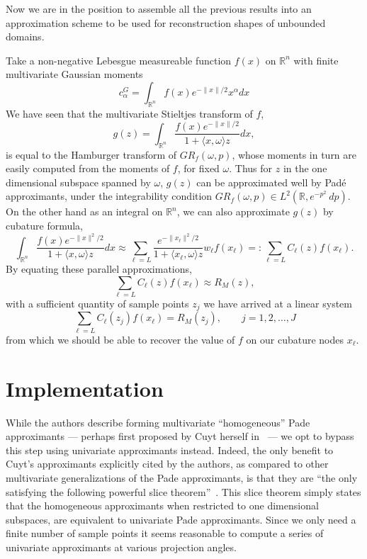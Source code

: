 \documentclass{amsart}
\theoremstyle{remark}
\numberwithin{equation}{section}
\newcommand{\RR}{\mathbb{R}}
\begin{document}



Now we are in the position to assemble all the previous results into an approximation scheme to be used for reconstruction shapes of unbounded domains.

Take a non-negative Lebesgue measureable function $f(x)$ on $\RR^n$ with finite multivariate Gaussian moments
\[
    c^G_\alpha = \int_{\RR^n} f(x)e^{-\|x\|/2} x^\alpha dx
\]
We have seen that the multivariate Stieltjes transform of $f$, 
\[
    g(z) = \int_{\RR^n} \frac{f(x)e^{-\|x\|/2}}{1 + \langle x, \omega \rangle z} dx,
\]
is equal to the Hamburger transform of $GR_f(\omega, p)$, whose moments in turn are easily computed from the moments of $f$, for fixed $\omega$. Thus for $z$ in the one dimensional subspace spanned by $\omega$, $g(z)$ can be approximated well by Pad\'e approximants, under the integrability condition $GR_f(\omega, p) \in L^2(\RR, e^{-p^2}~dp)$. On the other hand as an integral on $\RR^n$, we can also approximate $g(z)$ by cubature formula,
\[
    \int_{\RR^n} \frac{f(x)e^{-\|x\|^2/2}}{1 + \langle x, \omega \rangle z} dx 
    \approx \sum_{\ell = L} \frac{e^{-\|x_\ell\|^2/2}}{1 + \langle x_\ell, \omega \rangle z} w_\ell f(x_\ell)
    =: \sum_{\ell = L} C_\ell(z) f(x_\ell).
\]
By equating these parallel approximations, 
\[
    \sum_{\ell = L} C_\ell(z) f(x_\ell) \approx R_M(z),
\]
with a sufficient quantity of sample points $z_j$ we have arrived at a linear system
\[
    \sum_{\ell = L} C_\ell(z_j) f(x_\ell) = R_M(z_j), 
    \qquad j = 1, 2, \ldots, J
\]
from which we should be able to recover the value of $f$ on our cubature nodes $x_\ell$.




\section{Implementation}

While the authors describe forming multivariate ``homogeneous'' Pade approximants — perhaps first proposed by Cuyt herself in~\cite{Cuyt84} — we opt to bypass this step using univariate approximants instead. Indeed, the only benefit to Cuyt's approximants explicitly cited by the authors, as compared to other multivariate generalizations of the Pade approximants, is that they are ``the only satisfying the following powerful slice theorem''~\cite{Cuyt05}. This slice theorem simply states that the homogeneous approximants when restricted to one dimensional subspaces, are equivalent to univariate Pade approximants. Since we only need a finite number of sample points it seems reasonable to compute a series of univariate approximants at various projection angles.
\end{document}
